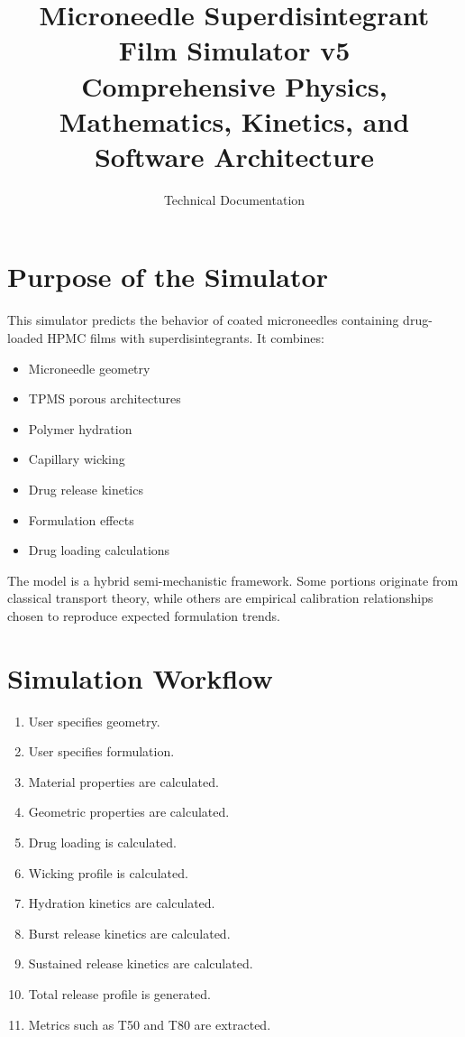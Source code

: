 \documentclass[11pt]{article}
\title{Microneedle Superdisintegrant Film Simulator v5\\Comprehensive Physics, Mathematics, Kinetics, and Software Architecture}
\author{Technical Documentation}
\date{}
\begin{document}
\maketitle
\tableofcontents
\newpage

\section{Purpose of the Simulator}

This simulator predicts the behavior of coated microneedles containing drug-loaded HPMC films with superdisintegrants. It combines:

\begin{itemize}
\item Microneedle geometry
\item TPMS porous architectures
\item Polymer hydration
\item Capillary wicking
\item Drug release kinetics
\item Formulation effects
\item Drug loading calculations
\end{itemize}

The model is a hybrid semi-mechanistic framework. Some portions originate from classical transport theory, while others are empirical calibration relationships chosen to reproduce expected formulation trends.

\section{Simulation Workflow}

\begin{enumerate}
\item User specifies geometry.
\item User specifies formulation.
\item Material properties are calculated.
\item Geometric properties are calculated.
\item Drug loading is calculated.
\item Wicking profile is calculated.
\item Hydration kinetics are calculated.
\item Burst release kinetics are calculated.
\item Sustained release kinetics are calculated.
\item Total release profile is generated.
\item Metrics such as T50 and T80 are extracted.
\end{enumerate}
\end{document}
